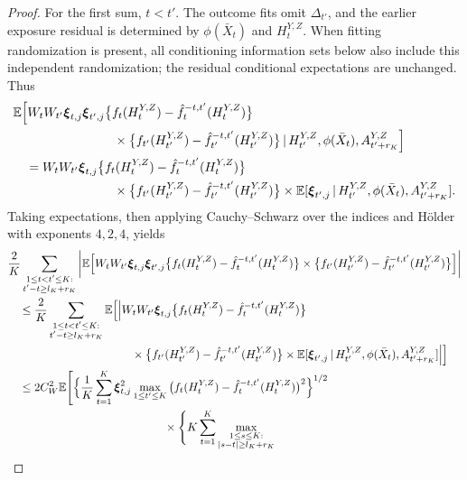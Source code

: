 \documentclass[12pt]{article}
\def\E{\mathbb{E}}
\newcommand\given{\,|\,}
\numberwithin{equation}{section}
\begin{document}
\begin{proof}
For the first sum, \(t<t'\). The outcome fits omit
\(\Delta_{t'}\), and the earlier exposure residual is determined
by \(\phi(\bar X_t)\) and \(H_t^{Y,Z}\).
When fitting randomization is present, all conditioning information
sets below also include this independent randomization; the residual
conditional expectations are unchanged.
Thus
\begin{align*}
&\E\Big[
W_tW_{t'}\boldsymbol\xi_{t,j}\boldsymbol\xi_{t',j}
\big\{f_t(H_t^{Y,Z})-\hat f_t^{-t,t'}(H_t^{Y,Z})\big\}\\
&\hspace{28mm}{}\times
\big\{f_{t'}(H_{t'}^{Y,Z})
-\hat f_{t'}^{-t,t'}(H_{t'}^{Y,Z})\big\}
\given H_{t'}^{Y,Z},\phi(\bar X_t),A_{t'+r_K}^{Y,Z}
\Big]\\
&\quad=
W_tW_{t'}\boldsymbol\xi_{t,j}
\big\{f_t(H_t^{Y,Z})-\hat f_t^{-t,t'}(H_t^{Y,Z})\big\}\\
&\hspace{28mm}{}\times
\big\{f_{t'}(H_{t'}^{Y,Z})
-\hat f_{t'}^{-t,t'}(H_{t'}^{Y,Z})\big\}\times
\E[\boldsymbol\xi_{t',j}\given
H_{t'}^{Y,Z},\phi(\bar X_t),A_{t'+r_K}^{Y,Z}].
\end{align*}
Taking expectations, then applying Cauchy--Schwarz over the indices
and H\"older with exponents \(4,2,4\), yields
\begin{align}
&\frac2K\sum_{\substack{1\leq t<t'\leq K:\\
t'-t\geq l_K+r_K}}
\bigg|\E\Big[
W_tW_{t'}\boldsymbol\xi_{t,j}\boldsymbol\xi_{t',j}
\big\{f_t(H_t^{Y,Z})-\hat f_t^{-t,t'}(H_t^{Y,Z})\big\}
\times
\big\{f_{t'}(H_{t'}^{Y,Z})
-\hat f_{t'}^{-t,t'}(H_{t'}^{Y,Z})\big\}
\Big]\bigg|
\notag\\
&\quad\leq\frac2K\sum_{\substack{1\leq t<t'\leq K:\\
t'-t\geq l_K+r_K}}
\E\Big[
\Big|W_tW_{t'}\boldsymbol\xi_{t,j}
\big\{f_t(H_t^{Y,Z})-\hat f_t^{-t,t'}(H_t^{Y,Z})\big\}
\notag\\*
&\hspace{38mm}{}\times
\big\{f_{t'}(H_{t'}^{Y,Z})
-\hat f_{t'}^{-t,t'}(H_{t'}^{Y,Z})\big\}
\times
\E[\boldsymbol\xi_{t',j}\given
H_{t'}^{Y,Z},\phi(\bar X_t),A_{t'+r_K}^{Y,Z}]
\Big|
\Big]
\notag\\
&\quad\leq2C_W^2\E\Bigg[
\Big\{\frac1K\sum_{t=1}^K\boldsymbol\xi_{t,j}^2
\max_{1\leq t'\leq K}
\big(f_t(H_t^{Y,Z})-\hat f_t^{-t,t'}(H_t^{Y,Z})\big)^2
\Big\}^{1/2}
\notag\\*
&\hspace{48mm}{}\times
\Bigg\{K\sum_{t=1}^K
\max_{\substack{1\leq s\leq K:\\|s-t|\geq l_K+r_K}}

\end{align}
\end{proof}
\end{document}
